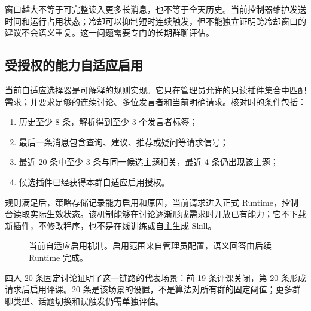 窗口越大不等于可完整读入更多长消息，也不等于全天历史。当前控制器维护发送时间和运行占用状态；冷却可以抑制短时连续触发，但不能独立证明跨冷却窗口的建议不会语义重复。这一问题需要专门的长期群聊评估。

\subsection{受授权的能力自适应启用}
当前自适应选择器是可解释的规则实现。它只在管理员允许的只读插件集合中匹配需求；并要求足够的连续讨论、多位发言者和当前明确请求。核对时的条件包括：
\begin{enumerate}
\item 历史至少 8 条，解析得到至少 3 个发言者标签；
\item 最后一条消息包含查询、建议、推荐或疑问等请求信号；
\item 最近 20 条中至少 3 条与同一候选主题相关，最近 4 条仍出现该主题；
\item 候选插件已经获得本群自适应启用授权。
\end{enumerate}

规则满足后，策略存储记录能力启用和原因，当前请求进入正式 Runtime，控制台读取实际生效状态。该机制能够在讨论逐渐形成需求时开放已有能力；它不下载新插件，不修改程序，也不是在线训练或自主生成 Skill。

\begin{figure}[H]\centering
{}
\caption{当前自适应启用机制。启用范围来自管理员配置，语义回答由后续 Runtime 完成。}
\end{figure}

四人 20 条固定讨论证明了这一链路的代表场景：前 19 条评课关闭，第 20 条形成请求后启用评课。20 条是该场景的设置，不是算法对所有群的固定阈值；更多群聊类型、话题切换和误触发仍需单独评估。

